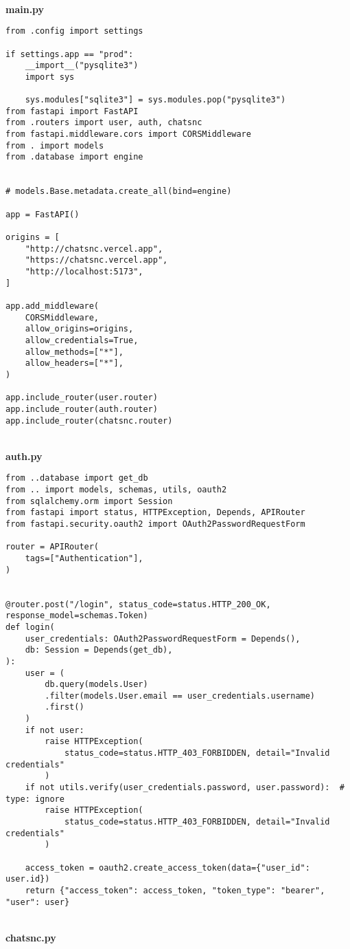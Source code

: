 \
\\
\textbf{main.py}

\begin{Verbatim}[breaklines=true, breakanywhere=true]
from .config import settings

if settings.app == "prod":
    __import__("pysqlite3")
    import sys

    sys.modules["sqlite3"] = sys.modules.pop("pysqlite3")
from fastapi import FastAPI
from .routers import user, auth, chatsnc
from fastapi.middleware.cors import CORSMiddleware
from . import models
from .database import engine


# models.Base.metadata.create_all(bind=engine)

app = FastAPI()

origins = [
    "http://chatsnc.vercel.app",
    "https://chatsnc.vercel.app",
    "http://localhost:5173",
]

app.add_middleware(
    CORSMiddleware,
    allow_origins=origins,
    allow_credentials=True,
    allow_methods=["*"],
    allow_headers=["*"],
)

app.include_router(user.router)
app.include_router(auth.router)
app.include_router(chatsnc.router)
\end{Verbatim}

\
\\
\textbf{auth.py}

\begin{Verbatim}[breaklines=true, breakanywhere=true]
from ..database import get_db
from .. import models, schemas, utils, oauth2
from sqlalchemy.orm import Session
from fastapi import status, HTTPException, Depends, APIRouter
from fastapi.security.oauth2 import OAuth2PasswordRequestForm

router = APIRouter(
    tags=["Authentication"],
)


@router.post("/login", status_code=status.HTTP_200_OK, response_model=schemas.Token)
def login(
    user_credentials: OAuth2PasswordRequestForm = Depends(),
    db: Session = Depends(get_db),
):
    user = (
        db.query(models.User)
        .filter(models.User.email == user_credentials.username)
        .first()
    )
    if not user:
        raise HTTPException(
            status_code=status.HTTP_403_FORBIDDEN, detail="Invalid credentials"
        )
    if not utils.verify(user_credentials.password, user.password):  # type: ignore
        raise HTTPException(
            status_code=status.HTTP_403_FORBIDDEN, detail="Invalid credentials"
        )

    access_token = oauth2.create_access_token(data={"user_id": user.id})
    return {"access_token": access_token, "token_type": "bearer", "user": user}

\end{Verbatim}
\
\\
\textbf{chatsnc.py}

